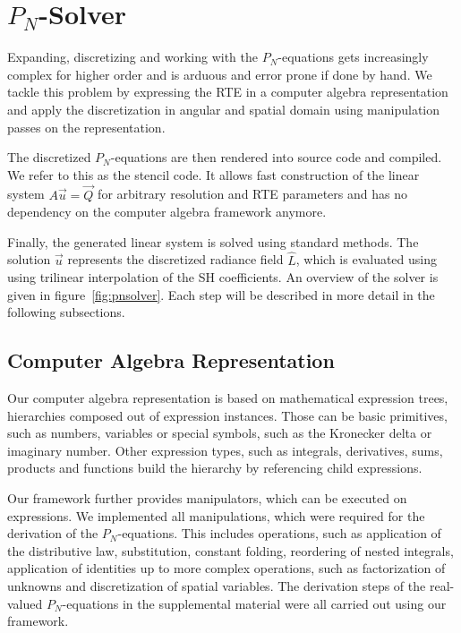 

\section{$P_N$-Solver}
\label{sec:pnsolver}



Expanding, discretizing and working with the $P_N$-equations gets increasingly complex for higher order and is arduous and error prone if done by hand. We tackle this problem by expressing the RTE in a computer algebra representation and apply the discretization in angular and spatial domain using manipulation passes on the representation.

The discretized $P_N$-equations are then rendered into source code and compiled. We refer to this as the stencil code. It allows fast construction of the linear system $A\vec{u}=\vec{Q}$ for arbitrary resolution and RTE parameters and has no dependency on the computer algebra framework anymore.

Finally, the generated linear system is solved using standard methods. The solution $\vec{u}$ represents the discretized radiance field $\widehat{L}$, which is evaluated using using trilinear interpolation of the SH coefficients. An overview of the solver is given in figure~\ref{fig:pnsolver}. Each step will be described in more detail in the following subsections.

\subsection{Computer Algebra Representation}

Our computer algebra representation is based on mathematical expression trees, hierarchies composed out of expression instances. Those can be basic primitives, such as numbers, variables or special symbols, such as the Kronecker delta or imaginary number. Other expression types, such as integrals, derivatives, sums, products and functions build the hierarchy by referencing child expressions.

Our framework further provides manipulators, which can be executed on expressions. We implemented all manipulations, which were required for the derivation of the $P_N$-equations. This includes operations, such as application of the distributive law, substitution, constant folding, reordering of nested integrals, application of identities up to more complex operations, such as factorization of unknowns and discretization of spatial variables. The derivation steps of the real-valued $P_N$-equations in the supplemental material were all carried out using our framework.

